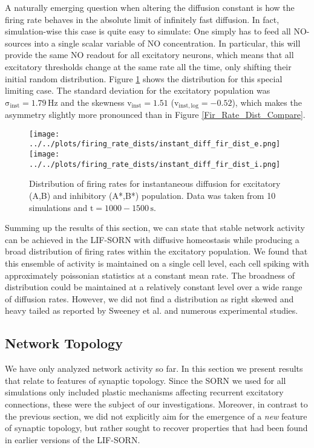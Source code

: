 \documentclass[10pt,a4paper]{article}
\begin{document}
A naturally emerging question when altering the diffusion constant is how the firing rate behaves in the absolute limit of infinitely fast diffusion. In fact, simulation-wise this case is quite easy to simulate: One simply has  to feed all NO-sources into a single scalar variable of NO concentration. In particular, this will provide the same NO readout for all excitatory neurons, which means that all excitatory thresholds change at the same rate all the time, only shifting their initial random distribution. Figure \ref{Fir_Rate_Dist_Instant_compare} shows the distribution for this special limiting case. The standard deviation for the excitatory population was $\mathrm{\sigma_{inst} = 1.79\, Hz}$ and the skewness $\mathrm{v_{inst} = 1.51}$ ($\mathrm{v_{inst,log} = -0.52}$), which makes the asymmetry slightly more pronounced than in Figure \ref{Fir_Rate_Dist_Compare}.  
\begin{figure}
\texttt{[image: ../../plots/firing\_rate\_dists/instant\_diff\_fir\_dist\_e.png]}
\texttt{[image: ../../plots/firing\_rate\_dists/instant\_diff\_fir\_dist\_i.png]}
\caption{Distribution of firing rates for instantaneous diffusion for excitatory (A,B) and inhibitory (A*,B*) population. Data was taken from 10 simulations and $\mathrm{t=1000-1500\,s}$.}
\label{Fir_Rate_Dist_Instant_compare}
\end{figure}

Summing up the results of this section, we can state that stable network activity can be achieved in the LIF-SORN with diffusive homeostasis while producing a broad distribution of firing rates within the excitatory population. We found that this ensemble of activity is maintained on a single cell level, each cell spiking with approximately poissonian statistics at a constant mean rate. The broadness of distribution could be maintained at a relatively constant level over a wide range of diffusion rates. However, we did not find a distribution as right skewed and heavy tailed as reported by Sweeney et al. and numerous experimental studies.

\subsection{Network Topology}\label{Network_Topology_Section}
We have only analyzed network activity so far. In this section we present results that relate to features of synaptic topology. Since the SORN we used for all simulations only included plastic mechanisms affecting recurrent excitatory connections, these were the subject of our investigations. Moreover, in contrast to the previous section, we did not explicitly aim for the emergence of a \emph{new} feature of synaptic topology, but rather sought to recover properties that had been found in earlier versions of the LIF-SORN.
\end{document}
